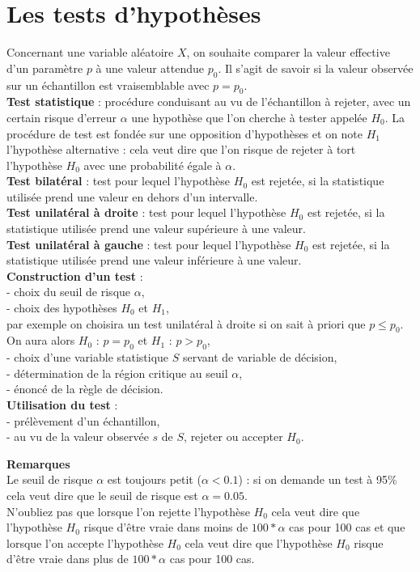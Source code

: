 \documentclass[a4paper,11pt]{book}
\begin{document}
\section{Les tests d'hypoth\`eses}
Concernant une variable al\'eatoire $X$, on souhaite comparer la valeur
 effective d'un param\`etre $p$ \`a une valeur attendue $p_0$. Il s'agit de 
savoir si la valeur observ\'ee sur un \'echantillon est vraisemblable avec 
$p=p_0$.\\ 
{\bf Test statistique} : proc\'edure conduisant au vu de l'\'echantillon \`a 
rejeter, avec un certain risque d'erreur $\alpha$ une hypoth\`ese que l'on 
cherche \`a tester appel\'ee $H_0$. La proc\'edure de test est fond\'ee sur 
une opposition d'hypoth\`eses et on note $H_1$ l'hypoth\`ese alternative : 
cela veut dire que l'on risque de rejeter \`a tort l'hypoth\`ese $H_0$ avec
 une probabilit\'e \'egale \`a $\alpha$.\\
{\bf Test bilat\'eral} : test pour lequel l'hypoth\`ese $H_0$ est rejet\'ee,
si la statistique utilis\'ee prend une valeur en dehors d'un intervalle.\\
{\bf Test unilat\'eral \`a droite} : test pour lequel l'hypoth\`ese $H_0$ est 
rejet\'ee, si la statistique utilis\'ee prend une valeur sup\'erieure \`a une 
valeur.\\ 
{\bf Test unilat\'eral \`a gauche} : test pour lequel l'hypoth\`ese $H_0$ est 
rejet\'ee, si la statistique utilis\'ee prend une valeur inf\'erieure \`a une 
valeur.\\
{\bf Construction d'un test} :\\
- choix du seuil de risque  $\alpha$,\\ 
- choix des hypoth\`eses $H_0$ et $H_1$,\\
par exemple on choisira un test unilat\'eral \`a droite si on sait \`a priori 
que $p \leq p_0$. On aura alors $H_0$ : $p=p_0$ et  $H_1$ : $p > p_0$,\\
- choix d'une variable statistique $S$ servant de variable de d\'ecision,\\
- d\'etermination de la r\'egion critique au seuil $\alpha$,\\
- \'enonc\'e de la r\`egle de d\'ecision.\\
{\bf Utilisation du test} :\\
- pr\'el\`evement d'un \'echantillon,\\
- au vu de la valeur observ\'ee $s$ de $S$, rejeter ou accepter $H_0$.

{\bf Remarques}\\
Le seuil de risque  $\alpha$ est toujours petit ($\alpha<0.1$) : si on 
demande  un test \`a 95\% cela veut dire que le seuil de 
risque est $\alpha=0.05$.\\
N'oubliez pas que lorsque l'on rejette l'hypoth\`ese  $H_0$ cela veut dire que 
l'hypoth\`ese  $H_0$ risque d'\^etre vraie dans moins de $100*\alpha$ cas pour
100 cas et
 que lorsque l'on accepte l'hypoth\`ese  $H_0$ cela veut dire que 
l'hypoth\`ese  $H_0$ risque d'\^etre vraie dans plus de $100*\alpha$ cas pour
100  cas.
\end{document}
